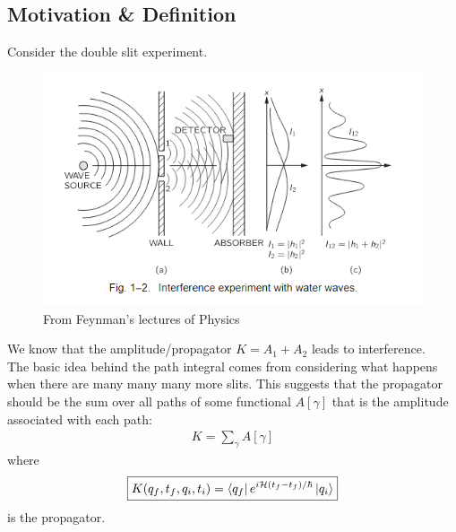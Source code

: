 \documentclass{book}
\theoremstyle{definition}
\newcommand{\had}{\mathcal{H}}
\begin{document}
\subsection{Motivation \& Definition}

Consider the double slit experiment. 
\begin{figure}[!htb]
	\centering
	\includegraphics[scale=0.8]{double-slit}
	\caption{From Feynman's lectures of Physics}
\end{figure}

We know that the amplitude/propagator $K = A_1 + A_2$ leads to interference. \\

The basic idea behind the path integral comes from considering what happens when there are many many many more slits. This suggests that the propagator should be the sum over all paths of some functional $A[\gamma]$ that is the amplitude associated with each path:
\begin{align}
K =\sum_\gamma A[\gamma]
\end{align}
where 
\begin{align}
\boxed{K(q_f,t_f, q_i,t_i) = \bra{q_f} e^{i\had (t_f - t_f)/\hbar} \ket{q_i}}
\end{align}
is the propagator. \\
\end{document}
